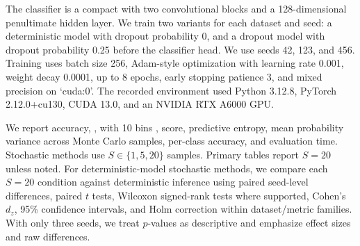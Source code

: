 

The classifier is a compact \cnn with two convolutional blocks and a 128-dimensional penultimate hidden layer. We train two variants for each dataset and seed: a deterministic model with dropout probability 0, and a dropout model with dropout probability 0.25 before the classifier head. We use seeds 42, 123, and 456. Training uses batch size 256, Adam-style optimization with learning rate 0.001, weight decay 0.0001, up to 8 epochs, early stopping patience 3, and mixed precision on `cuda:0'. The recorded environment used Python 3.12.8, PyTorch 2.12.0+cu130, CUDA 13.0, and an NVIDIA RTX A6000 GPU.

We report accuracy, \nll, \ece with 10 bins \cite{guo2017calibration}, \brier score, predictive entropy, mean probability variance across Monte Carlo samples, per-class accuracy, and evaluation time. Stochastic methods use $S \in \{1,5,20\}$ samples. Primary tables report $S=20$ unless noted. For deterministic-model stochastic methods, we compare each $S=20$ condition against deterministic inference using paired seed-level differences, paired $t$ tests, Wilcoxon signed-rank tests where supported, Cohen's $d_z$, 95\% confidence intervals, and Holm correction within dataset/metric families. With only three seeds, we treat $p$-values as descriptive and emphasize effect sizes and raw differences.
